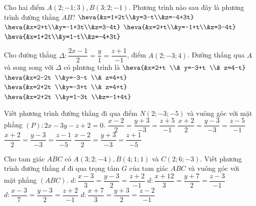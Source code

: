 \begin{ex}
	Cho hai điểm $A(2;-1;3), B(3;2;-1)$. Phương trình nào sau đây là phương trình đường thẳng $AB$?
	\choice
	{$\heva{&x=1+2t\\&y=3-t\\&z=-4+3t}$}
	{\True $\heva{&x=2+t\\&y=-1+3t\\&z=3-4t}$}
	{$\heva{&x=2+t\\&y=-1+t\\&z=3-4t}$}
	{$\heva{&x=1+2t\\&y=1-t\\&z=-4+3t}$}
	\loigiai{
	}
\end{ex}


\begin{ex}
	Cho đường thẳng $\Delta: \dfrac{2x-1}{2}=\dfrac{y}{1}=\dfrac{z+1}{-1}$, điểm $A(2;-3;4)$. Đường thẳng qua $A$ và song song với $\Delta$ có phương trình là
	\choice
	{ $\heva{&x=2+t  \\&	y=-3+t  \\&	z=4-t}$}
	{\True $\heva{&x=2-2t  \\&y=-3-t  \\&	z=4+t}$}
	{$\heva{&x=2+2t  \\&y=-3+t  \\&	z=4+t}$}
	{ $\heva{&x=2+2t  \\&y=1-3t  \\&z=-1+4t}$}
	\loigiai{
	}
\end{ex}


\begin{ex}
	Viết phương trình đường thẳng đi qua điểm $N(2;-3;-5)$ và vuông góc với mặt phẳng $(P): 2x-3y-z+2=0$.
	\choice
	{\True $\dfrac{x-2}{2}=\dfrac{y+3}{-3}=\dfrac{z+5}{-1}$}
	{$\dfrac{x+2}{2}=\dfrac{y-3}{-3}=\dfrac{z-5}{-1}$}
	{$\dfrac{x+2}{2}=\dfrac{y-3}{-3}=\dfrac{z-1}{-5}$}
	{$\dfrac{x-2}{2}=\dfrac{y+3}{-3}=\dfrac{z+1}{-5}$}
	\loigiai{
	}
\end{ex}


\begin{ex}
	Cho tam giác $ABC$ có $A(3;2;-4), B(4;1;1)$ và $C(2;6;-3).$ Viết phương trình đường thẳng $d$ đi qua trọng tâm $G$ của tam giác $ABC$ và vuông góc với mặt phẳng $(ABC)$.
	\choice
	{$d:\dfrac{x-3}{3}=\dfrac{y-3}{2}=\dfrac{z+2}{-1}$}
	{$d:\dfrac{x+12}{3}=\dfrac{y+7}{2}=\dfrac{z-3}{-1}$}
	{\True $d:\dfrac{x-3}{7}=\dfrac{y-3}{2}=\dfrac{z+2}{-1}$}
	{$d:\dfrac{x+7}{3}=\dfrac{y+3}{2}=\dfrac{z-2}{-1}$}
	\loigiai{
	}
\end{ex}


